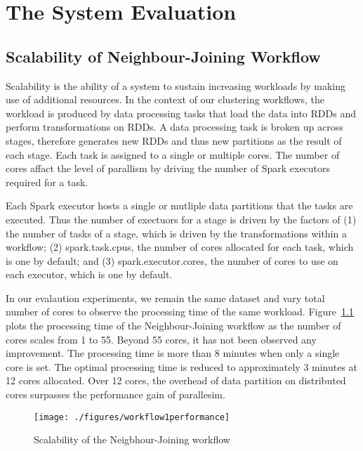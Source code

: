 \chapter{The System Evaluation}

\section{Scalability of Neighbour-Joining Workflow}

Scalability is the ability of a system to sustain increasing workloads by making use of additional resources. In the context of our clustering workflows, the workload is produced by data processing tasks that load the data into RDDs and perform transformations on RDDs. A data processing task is broken up across stages, therefore generates new RDDs and thus new partitions as the result of each stage. Each task is assigned to a single or multiple cores. The number of cores affact the level of parallism by driving the number of Spark executors required for a task. 

Each Spark executor hosts a single or mutliple data partitions that the tasks are executed. Thus the number of exectuors for a stage is driven by the factors of (1) the number of tasks of a stage, which is driven by the transformations within a workflow; (2) \textsf{spark.task.cpus}, the number of cores allocated for each task, which is one by default; and (3) \textsf{spark.executor.cores}, the number of cores to use on each executor, which is one by default. 


In our evalaution experiments, we remain the same dataset and vary total number of cores to observe the processing time of the same workload. Figure~\ref{Fig:scalability-nj} plots the processing time of the Neighbour-Joining workflow as the number of cores scales from 1 to 55. Beyond 55 cores, it has not been observed any improvement. The processing time is more than 8 minutes when only a single core is set. The optimal processing time is reduced to approximately 3 minutes at 12 cores allocated. Over 12 cores, the overhead of data partition on distributed cores surpasses the performance gain of parallesim. 


\begin{figure}
	\centering
	\texttt{[image: ./figures/workflow1performance]}
	\caption{Scalability of the Neigbhour-Joining workflow}
	\label{Fig:scalability-nj}
	
\end{figure}

